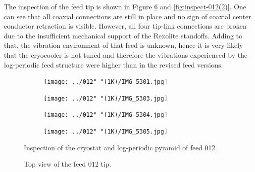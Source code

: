 \documentclass[12pt,a4paper,oneside]{article}
\begin{document}
The inspection of the feed tip is shown in Figure \ref{fig:inspect-012(1)} and \ref{fig:inspect-012(2)}. One can see that all coaxial connections are still in place and no sign of coaxial center conductor retraction is visible. However, all four tip-link connections are broken due to the insufficient mechanical support of the Rexolite standoffs. Adding to that, the vibration environment of that feed is unknown, hence it is very likely that the cryocooler is not tuned and therefore the vibrations experienced by the log-periodic feed structure were higher than in the revised feed versions.


\newpage
%
\begin{figure}[H]
    \centering
        \begin{subfigure}[t]{0.475\textwidth}
        \centering
        \texttt{[image: ../012" "(1K)/IMG\_5301.jpg]}
        \caption{}
        \label{fig:Tsys-1g}
   	 \end{subfigure}
        \begin{subfigure}[t]{0.475\textwidth}
        \centering
        \texttt{[image: ../012" "(1K)/IMG\_5303.jpg]}
        \caption{}
        \label{fig:Y-factor-1g}
   	\end{subfigure}
   
   
        \begin{subfigure}[t]{0.475\textwidth}
        \centering
        \texttt{[image: ../012" "(1K)/IMG\_5304.jpg]}
        \caption{}
        \label{fig:SpecX-1g}
   	 \end{subfigure}
        \begin{subfigure}[t]{0.475\textwidth}
        \centering
        \texttt{[image: ../012" "(1K)/IMG\_5305.jpg]}
        \caption{}
        \label{fig:SpecY-1g}
  	\end{subfigure}  
    \caption{Inspection of the cryostat and log-periodic pyramid of feed 012. }
    \label{fig:inspect-012(0)}
\end{figure}


%
\begin{figure}[H]
\caption{Top view of the feed 012 tip.}
\label{fig:inspect-012(1)}
\end{figure}
%
\end{document}
